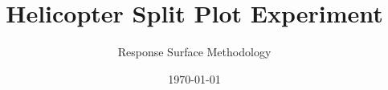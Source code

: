 \documentclass[
]{beamer}
\begin{document}
\title[Short Presentation Title]{Helicopter Split Plot Experiment}
\subtitle[Short Presentation Subtitle]{Response Surface Methodology}
\date{\today}
\subject{Presentation Subject}

\begin{frame}[plain]
\maketitle
\end{frame}
\end{document}
